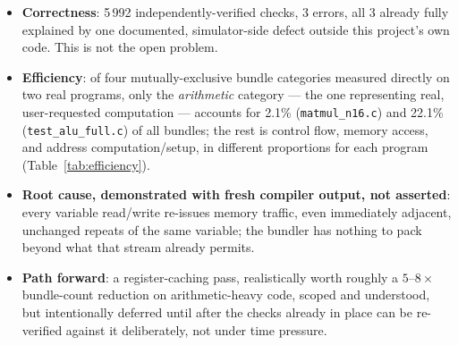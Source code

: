 \documentclass[11pt,a4paper]{article}
\begin{document}
\begin{itemize}
  \item \textbf{Correctness}: 5\,992 independently-verified checks, 3 errors, all 3
        already fully explained by one documented, simulator-side defect outside this
        project's own code. This is not the open problem.
  \item \textbf{Efficiency}: of four mutually-exclusive bundle categories measured
        directly on two real programs, only the \emph{arithmetic} category --- the one
        representing real, user-requested computation --- accounts for 2.1\%
        (\texttt{matmul\_n16.c}) and 22.1\% (\texttt{test\_alu\_full.c}) of all bundles;
        the rest is control flow, memory access, and address computation/setup, in
        different proportions for each program (Table~\ref{tab:efficiency}).
  \item \textbf{Root cause, demonstrated with fresh compiler output, not asserted}: every
        variable read/write re-issues memory traffic, even immediately adjacent,
        unchanged repeats of the same variable; the bundler has nothing to pack beyond
        what that stream already permits.
  \item \textbf{Path forward}: a register-caching pass, realistically worth roughly a
        $5$--$8\times$ bundle-count reduction on arithmetic-heavy code, scoped and
        understood, but intentionally deferred until after the checks already in place
        can be re-verified against it deliberately, not under time pressure.
\end{itemize}
\end{document}
